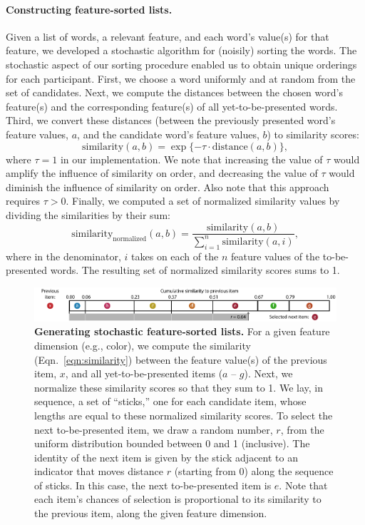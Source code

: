 \documentclass[11pt]{article}
\begin{document}
\paragraph{Constructing feature-sorted lists.} Given a list of words, a
relevant feature, and each word's value(s) for that feature, we developed a
stochastic algorithm for (noisily) sorting the words. The stochastic aspect of
our sorting procedure enabled us to obtain unique orderings for each
participant. First, we choose a word uniformly and at random from the set of
candidates. Next, we compute the distances between the chosen word's feature(s)
and the corresponding feature(s) of all yet-to-be-presented words. Third, we
convert these distances (between the previously presented word's feature
values, $a$, and the candidate word's feature values, $b$) to similarity
scores: \begin{equation} \mathrm{similarity}(a, b) = \exp\{-\tau \cdot
\mathrm{distance}(a, b)\}, \label{eqn:similarity} \end{equation} where $\tau =
1$ in our implementation. We note that increasing the value of $\tau$ would
amplify the influence of similarity on order, and decreasing the value of
$\tau$ would diminish the influence of similarity on order. Also note that this
approach requires $\tau > 0$. Finally, we computed a set of normalized
similarity values by dividing the similarities by their sum: \begin{equation}
\mathrm{similarity}_{\mathrm{normalized}}(a, b) = \frac{\mathrm{similarity}(a,
b)}{\sum_{i=1}^n \mathrm{similarity}(a, i)}, \end{equation} where in the
denominator, $i$ takes on each of the $n$ feature values of the to-be-presented
words. The resulting set of normalized similarity scores sums to 1.

\begin{figure}[tp]
    \centering
        \includegraphics[width=\textwidth]{figures/stick}
        
\caption{\textbf{Generating stochastic feature-sorted lists.} For a given
feature dimension (e.g., color), we compute the similarity
(Eqn.~\ref{eqn:similarity}) between the feature value(s) of the previous item,
$x$, and all yet-to-be-presented items ($a$ -- $g$). Next, we normalize these
similarity scores so that they sum to 1. We lay, in sequence, a set of
``sticks,'' one for each candidate item, whose lengths are equal to these
normalized similarity scores. To select the next to-be-presented item, we draw
a random number, $r$, from the uniform distribution bounded between 0 and 1
(inclusive). The identity of the next item is given by the stick adjacent to an
indicator that moves distance $r$ (starting from 0) along the sequence of
sticks. In this case, the next to-be-presented item is $e$. Note that each
item's chances of selection is proportional to its similarity to the previous
item, along the given feature dimension.} \label{fig:stick}

\end{figure}
\end{document}
